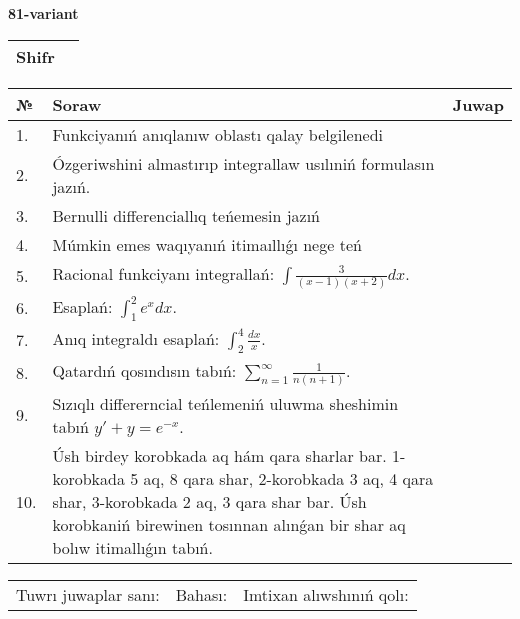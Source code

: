 \documentclass{article}
\begin{document}
  \egroup
  
  \newpage
  
  
  \textbf{81-variant}\\
  
  \bgroup
  \def\arraystretch{1.6} %
  
  \begin{tabular}{|m{5.7cm}|m{9.5cm}|}
  \hline
  Shifr & \\
  \hline
  \end{tabular}
  
  \vspace{1cm}
  
  \begin{tabular}{|m{0.7cm}|m{10cm}|m{4cm}|}
  \hline
  № & Soraw & Juwap \\
  \hline
  1. & Funkciyanıń anıqlanıw oblastı qalay belgilenedi &  \\
  \hline
  2. & Ózgeriwshini almastırıp integrallaw usılıniń formulasın jazıń. &  \\
  \hline
  3. & Bernulli differenciallıq teńemesin jazıń &  \\
  \hline
  4. & Múmkin emes waqıyanıń itimaıllıǵı nege teń &  \\
  \hline
  5. & Racional funkciyanı integrallań: \(\int{\frac{3}{(x - 1)(x + 2)}dx}\). &  \\
  \hline
  6. & Esaplań: \(\int_{1}^2 {e^{x}dx}\). &  \\
  \hline
  7. & Anıq integraldı esaplań: \(\int_{2}^{4}\frac{dx}{x}\). &  \\
  \hline
  8. & Qatardıń qosındısın tabıń: \(\sum_{n = 1}^{\infty}\frac{1}{n(n + 1)}\). &  \\
  \hline
  9. & Sızıqlı differerncial teńlemeniń uluwma sheshimin tabıń \(y' + y = e^{- x}\). &  \\
  \hline
  10. & Úsh birdey korobkada aq hám qara sharlar bar. 1-korobkada 5 aq, 8 qara shar, 2-korobkada 3 aq, 4 qara shar, 3-korobkada 2 aq, 3 qara shar bar. Úsh korobkaniń birewinen tosınnan alınǵan bir shar aq bolıw itimallıǵın tabıń. &  \\
  \hline
  \end{tabular}
  
  \vspace{1cm}
  
  \begin{tabular}{lll}
  Tuwrı juwaplar sanı: \underline{\hspace{1.5cm}} & 
  Bahası: \underline{\hspace{1.5cm}} & 
  Imtixan alıwshınıń qolı: \underline{\hspace{2cm}} \\
  \end{tabular}
  
\end{document}
